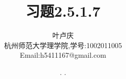 \documentclass[a4paper, 12pt]{article} %
\makeatletter
\renewcommand{\maketitle}{ %
  \renewcommand\refname{参考文献}
  \newcommand{\D}{\displaystyle}\newcommand{\ri}{\Rightarrow}
  \newcommand{\ds}{\displaystyle} \renewcommand{\ni}{\noindent}
  \newcommand{\pa}{\partial} \newcommand{\Om}{\Omega}
  \newcommand{\om}{\omega} \newcommand{\sik}{\sum_{i=1}^k}
  \newcommand{\vov}{\Vert\omega\Vert} \newcommand{\Umy}{U_{\mu_i,y^i}}
  \newcommand{\lamns}{\lambda_n^{^{\scriptstyle\sigma}}}
  \newcommand{\chiomn}{\chi_{_{\Omega_n}}}
  \newcommand{\ullim}{\underline{\lim}} \newcommand{\bsy}{\boldsymbol}
  \newcommand{\mvb}{\mathversion{bold}} \newcommand{\la}{\lambda}
  \newcommand{\La}{\Lambda} \newcommand{\va}{\varepsilon}
  \newcommand{\be}{\beta} \newcommand{\al}{\alpha}
  \newcommand{\dis}{\displaystyle} \newcommand{\R}{{\mathbb R}}
  \newcommand{\N}{{\mathbb N}} \newcommand{\cF}{{\mathcal F}}
  \newcommand{\gB}{{\mathfrak B}} \newcommand{\eps}{\epsilon}
  \begin{flushright} %
    {\LARGE\@title} %
    
    \vspace{50pt} %
    
    {\large\@author} %
    \\\@date %
    
    \vspace{40pt} %
  \end{flushright}
}
\makeatother
\begin{document}
\begin{CJK}{UTF8}{gkai}
  \title{\textbf{习题2.5.1.7}} 
  \author{\small{叶卢庆}\\{\small{杭州师范大学理学院,学号:1002011005}}\\{\small{Email:h5411167@gmail.com}}} %
  \renewcommand{\today}{\number\year. \number\month. \number\day}
  \date{\today} %
  
  
  
  \maketitle %
  
  
  
  
  
  
  

\end{CJK}
\end{document}
